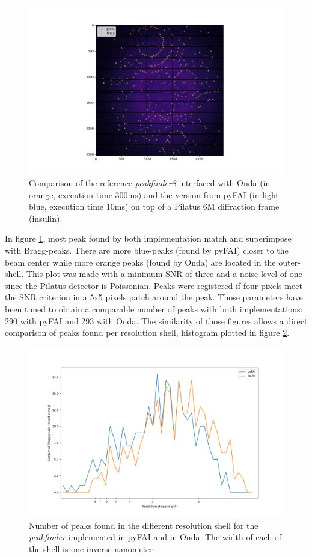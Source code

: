 \documentclass[preprint]{iucr}              %
\begin{document}
\begin{figure}
\label{peakfinder}
\includegraphics[width=12cm]{peakfinder}
\caption{Comparison of the reference \textit{peakfinder8} interfaced with Onda (in orange, execution time 300ms) and the version from pyFAI (in light blue, execution time 10ms) on top of a Pilatus 6M diffraction frame (insulin).}
\end{figure}

In figure \ref{peakfinder}, most peak found by both implementation match and superimpose with Bragg-peaks.
There are more blue-peaks (found by pyFAI) closer to the beam center while more orange peaks (found by Onda) are located in the outer-shell.
This plot was made with a minimum SNR of three and a noise level of one since the Pilatus detector is Poissonian.
Peaks were registered if four pixels meet the SNR criterion in a 5x5 pixels patch around the peak.
Those parameters have been tuned to obtain a comparable number of peaks with both implementations: 290 with pyFAI and 293 with Onda.
The similarity of those figures allows a direct comparison of peaks found per resolution shell, histogram plotted in figure \ref{peak_per_ring}.

\begin{figure}
\label{peak_per_ring}
\includegraphics[width=12cm]{peak_per_ring}
\caption{Number of peaks found in the different resolution shell for the \textit{peakfinder} implemented in pyFAI and in Onda. The width of each of the shell is one inverse nanometer.}
\end{figure}
\end{document}
